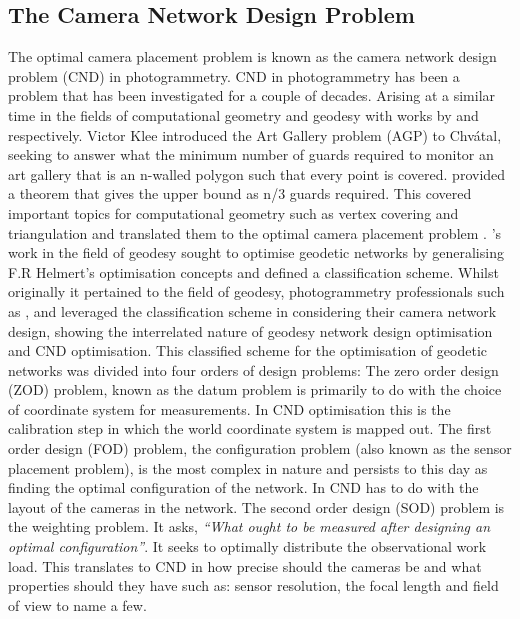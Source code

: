 \subsection{The Camera Network Design Problem}
The optimal camera placement problem is known as the camera network design problem (CND) in photogrammetry. CND in photogrammetry has been a problem that has been investigated for a couple of decades. Arising at a similar time in the fields of computational geometry and geodesy with works by \citet{chvatal1975combinatorial} and \citet{grafarend1974optimization} respectively. Victor Klee introduced the Art Gallery problem (AGP) to Chvátal, seeking to answer what the minimum number of guards required to monitor an art  gallery that is an n-walled polygon such that every point is covered. \citet{chvatal1975combinatorial} provided a theorem that gives the upper bound as n/3 guards required. This covered important topics for computational geometry such as vertex covering and triangulation and translated them to the optimal camera placement problem \cite{o1987art}.
\cite{grafarend1974optimization}'s work in the field of geodesy sought to optimise geodetic networks by generalising F.R Helmert's optimisation concepts and defined a classification scheme.  Whilst originally it pertained to the field of geodesy, photogrammetry professionals such as \citet{fraser1984network}, \citet{shortis1989network} and \cite{mason1994expert} leveraged the classification scheme in considering their camera network design, showing the interrelated nature of geodesy network design optimisation and CND optimisation. This classified scheme for the optimisation of geodetic networks was divided into four orders of design problems: 
The zero order design (ZOD) problem, known as the datum problem is primarily to do with the choice of coordinate system for measurements. In CND optimisation this is the calibration step in which the world coordinate system is mapped out. 
The first order design (FOD) problem, the configuration problem (also known as the sensor placement problem), is the most complex in nature and persists to this day as finding the optimal configuration of the network. In CND has to do with the layout of the cameras in the network. 
The second order design (SOD) problem is the weighting problem. It asks, \textit{``What ought to be 
measured after designing an optimal configuration''}. It seeks to optimally distribute the observational work load. This translates to CND in how precise should the cameras be and what properties should they have such as: sensor resolution, the focal length and field of view to name a few. 

